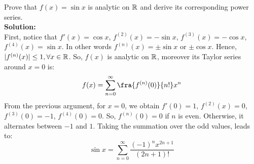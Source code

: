 \begin{eg}
    Prove that $f(x) = \sin x$ is analytic on $\mathbb{R}$ and derive its corresponding power series. \\
    \textbf{Solution:}\\
    First, notice that $f'(x) = \cos x$, $f^{(2)}(x) = -\sin x$, $f^{(3)}(x) = -\cos x$, $f^{(4)}(x) = \sin x$. In other words $f^{(n)}(x) = \pm \sin x$ or $\pm \cos x$. Hence, $|f^{(n)}(x)| \leq 1 , \forall x \in \mathbb{R}$. So, $f(x)$ is analytic on $\mathbb{R}$, moreover its Taylor series around $x = 0$ is:
    \begin{equation*}
        f(x) = \sum \limits_{n = 0}^\infty \fra{f^{(n)}(0)}{n!}x^n
    \end{equation*}
    From the previous argument, for $x = 0$, we obtain $f'(0) = 1$, $f^{(2)}(x) = 0$, $f^{(3)}(0) = -1$, $f^{(4)}(0) = 0$. So, $f^{(n)}(0) = 0$ if $n$ is even. Otherwise, it alternates between $-1$ and $1$. Taking the summation over the odd values, leads to:
    \begin{equation*}
        \sin x = \sum \limits_{n = 0}^\infty  \frac{(-1)^n x^{2n + 1}}{(2n+1)!}
    \end{equation*}
\end{eg}